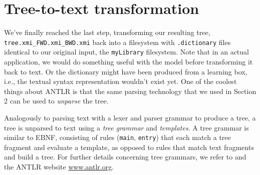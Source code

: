 \newpage
\hypertarget{finalStep}{}
\section{Tree-to-text transformation}
\genHeader

We've finally reached the last step, transforming our resulting tree, \texttt{tree\-.xmi\-\_FWD\-.xmi\-\_BWD\-.xmi} back into a filesystem with
\texttt{.dictionary} files identical to our original input, the \texttt{myLibrary} filesystem. Note that in an actual application, we would do something useful
with the model before transforming it back to text. Or the dictionary might have been produced from a learning box, i.e., the textual syntax representation
wouldn't exist yet. One of the coolest things about ANTLR is that the same parsing technology that we used in Section 2 can be used to \emph{unparse} the tree.

Analogously to parsing text with a lexer and parser grammar to produce a tree, a tree is unparsed to text using a \emph{tree grammar} and \emph{templates}. A
tree grammar is similar to EBNF, consisting of rules (\texttt{main}, \texttt{entry}) that each match a tree fragment and evaluate a template, as
opposed to rules that match text fragments and build a tree. For further details concerning tree grammars, we refer to \cite{ANTLR} and the ANTLR
website \url{www.antlr.org}.

